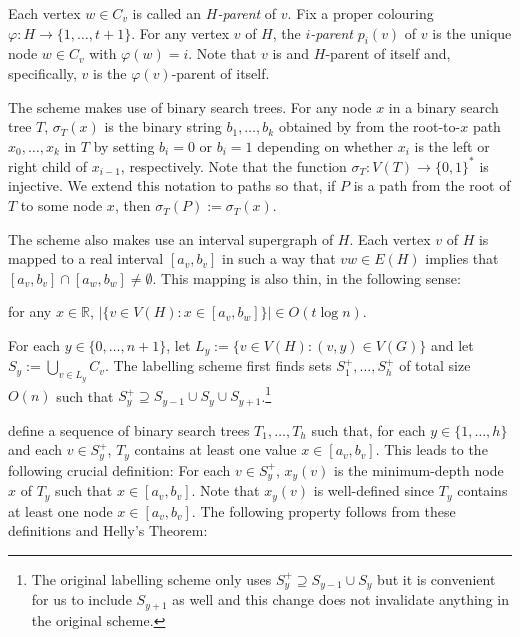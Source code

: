\documentclass{patmorin}
\newcommand{\R}{\mathbb{R}}
\begin{document}
Each vertex $w\in C_v$ is called an \emph{$H$-parent} of $v$.  Fix a proper colouring $\varphi:H\to\{1,\ldots,t+1\}$.  For any vertex $v$ of $H$, the \emph{$i$-parent} $p_i(v)$ of $v$ is the unique node $w\in C_v$ with $\varphi(w)=i$.  Note that $v$ is and $H$-parent of itself and, specifically, $v$ is the $\varphi(v)$-parent of itself.

The scheme makes use of binary search trees.  For any node $x$ in a binary search tree $T$, $\sigma_T(x)$ is the binary string $b_1,\ldots,b_k$ obtained by from the root-to-$x$ path $x_0,\ldots,x_k$ in $T$ by setting $b_i=0$ or $b_i=1$ depending on whether $x_i$ is the left or right child of $x_{i-1}$, respectively. Note that the function $\sigma_T:V(T)\to\{0,1\}^*$ is injective.  We extend this notation to paths so that, if $P$ is a path from the root of $T$ to some node $x$, then $\sigma_T(P):=\sigma_T(x)$.


The scheme also makes use an interval supergraph of $H$.  Each vertex $v$ of $H$ is mapped to a real interval $[a_v,b_v]$ in such a way that $vw\in E(H)$ implies that $[a_v,b_v]\cap [a_w,b_w]\neq\emptyset$.  This mapping is also thin, in the following sense:

\begin{compactenum}[(P1)]
    \item for any $x\in \R$, $|\{v\in V(H): x\in[a_v,b_w]\}|\in O(t\log n)$.\label{thin}
\end{compactenum}

For each $y\in\{0,\ldots,n+1\}$, let $L_y:=\{v\in V(H): (v,y)\in V(G)\}$ and let $S_y:=\bigcup_{v\in L_y}C_v$.  The labelling scheme first finds sets $S^+_1,\ldots,S^+_h$ of total size $O(n)$ such that $S^+_y\supseteq S_{y-1}\cup S_y\cup S_{y+1}$.\footnote{The original labelling scheme only uses $S^+_y\supseteq S_{y-1}\cup S_y$ but it is convenient for us to include $S_{y+1}$ as well and this change does not invalidate anything in the original scheme.}

\citet{dujmovic.esperet.ea:adjacency} define a sequence of binary search trees $T_1,\ldots,T_h$ such that, for each $y\in\{1,\ldots,h\}$ and each $v\in S^+_y$, $T_y$ contains at least one value $x\in [a_v,b_v]$.  This leads to the following crucial definition: For each $v\in S^+_y$, $x_{y}(v)$ is the minimum-depth node $x$ of $T_y$ such that $x\in [a_v,b_v]$. Note that $x_y(v)$ is well-defined since $T_y$ contains at least one node $x\in[a_v,b_v]$.   The following property follows from these definitions and Helly's Theorem:
\end{document}
